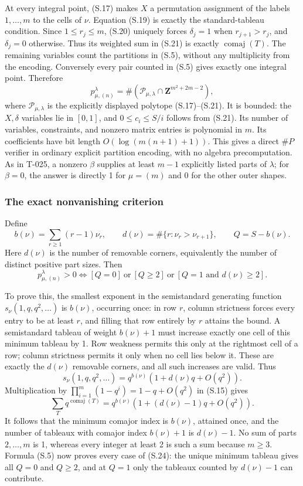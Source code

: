 \documentclass[
  10pt,
]{article}
\begin{document}
At every integral point, (S.17) makes \(X\) a permutation assignment of
the labels \(1,\ldots,m\) to the cells of \(\nu\). Equation (S.19) is
exactly the standard-tableau condition. Since \(1\le r_j\le m\), (S.20)
uniquely forces \(\delta_j=1\) when \(r_{j+1}>r_j\), and \(\delta_j=0\)
otherwise. Thus its weighted sum in (S.21) is exactly
\(\operatorname{comaj}(T)\). The remaining variables count the
partitions in (S.5), without any multiplicity from the encoding.
Conversely every pair counted in (S.5) gives exactly one integral point.
Therefore \[
\boxed{p_{\mu,(n)}^\lambda=\#(\mathcal P_{\mu,\lambda}\cap\mathbf Z^{m^2+2m-2}),}
\tag{S.22}
\] where \(\mathcal P_{\mu,\lambda}\) is the explicitly displayed
polytope (S.17)--(S.21). It is bounded: the \(X,\delta\) variables lie
in \([0,1]\), and \(0\le c_i\le S/i\) follows from (S.21). Its number of
variables, constraints, and nonzero matrix entries is polynomial in
\(m\). Its coefficients have bit length \(O(\log(m(n+1)+1))\). This
gives a direct \(\#P\) verifier in ordinary explicit partition encoding,
with no algebra precomputation. As in T-025, a nonzero \(\beta\)
supplies at least \(m-1\) explicitly listed parts of \(\lambda\); for
\(\beta=0\), the answer is directly 1 for \(\mu=(m)\) and 0 for the
other outer shapes.

\subsubsection{The exact nonvanishing
criterion}\label{the-exact-nonvanishing-criterion}

Define \[
b(\nu)=\sum_{r\ge1}(r-1)\nu_r,
\qquad d(\nu)=\#\{r:\nu_r>\nu_{r+1}\},
\qquad Q=S-b(\nu).
\tag{S.23}
\] Here \(d(\nu)\) is the number of removable corners, equivalently the
number of distinct positive part sizes. Then \[
\boxed{
p_{\mu,(n)}^\lambda>0
\Longleftrightarrow
\left[Q=0\right]\ \text{or}\ \left[Q\ge2\right]\ \text{or}\
\left[Q=1\text{ and }d(\nu)\ge2\right].}
\tag{S.24}
\]

To prove this, the smallest exponent in the semistandard generating
function \(s_\nu(1,q,q^2,\ldots)\) is \(b(\nu)\), occurring once: in row
\(r\), column strictness forces every entry to be at least \(r\), and
filling that row entirely by \(r\) attains the bound. A semistandard
tableau of weight \(b(\nu)+1\) must increase exactly one cell of this
minimum tableau by 1. Row weakness permits this only at the rightmost
cell of a row; column strictness permits it only when no cell lies below
it. These are exactly the \(d(\nu)\) removable corners, and all such
increases are valid. Thus \[
s_\nu(1,q,q^2,\ldots)=q^{b(\nu)}(1+d(\nu)q+O(q^2)).
\] Multiplication by \(\prod_{i=1}^m(1-q^i)=1-q+O(q^2)\) in (S.15) gives
\[
\sum_Tq^{\operatorname{comaj}(T)}
=q^{b(\nu)}(1+(d(\nu)-1)q+O(q^2)).
\tag{S.25}
\] It follows that the minimum comajor index is \(b(\nu)\), attained
once, and the number of tableaux with comajor index \(b(\nu)+1\) is
\(d(\nu)-1\). No sum of parts \(2,\ldots,m\) is 1, whereas every integer
at least 2 is such a sum because \(m\ge3\). Formula (S.5) now proves
every case of (S.24): the unique minimum tableau gives all \(Q=0\) and
\(Q\ge2\), and at \(Q=1\) only the tableaux counted by \(d(\nu)-1\) can
contribute.
\end{document}

